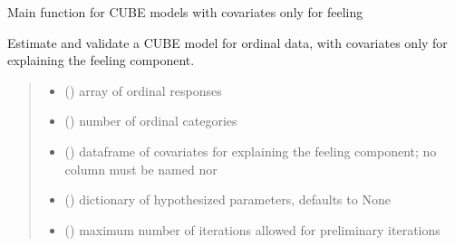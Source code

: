 \documentclass[letterpaper,10pt,english]{sphinxmanual}
\begin{document}

\begin{fulllineitems}
\label{\detokenize{cubmods:cubmods.cube_0w0.mle}}
\pysigstartsignatures
{}
\pysigstopsignatures
\sphinxAtStartPar
Main function for CUBE models with covariates only for feeling

\sphinxAtStartPar
Estimate and validate a CUBE model for ordinal data, with covariates only for explaining the
feeling component.
\begin{quote}\begin{description}
\begin{itemize}
\item {} 
\sphinxAtStartPar
{} () \textendash{} array of ordinal responses

\item {} 
\sphinxAtStartPar
{} () \textendash{} number of ordinal categories

\item {} 
\sphinxAtStartPar
{} () \textendash{} dataframe of covariates for explaining the feeling component;
no column must be named  nor 

\item {} 
\sphinxAtStartPar
{} (\sphinxstyleliteralemphasis{\sphinxupquote{, }}) \textendash{} dictionary of hypothesized parameters, defaults to None

\item {} 
\sphinxAtStartPar
{} () \textendash{} maximum number of iterations allowed for preliminary iterations


\end{itemize}
\end{description}
\end{quote}
\end{fulllineitems}
\end{document}

